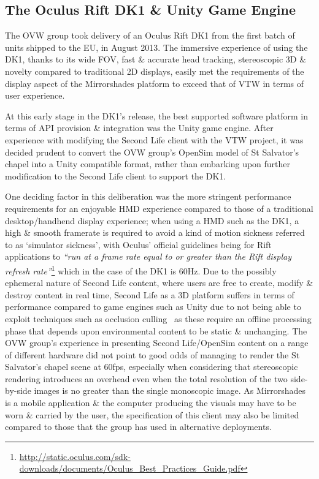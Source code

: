 

\subsection{The Oculus Rift DK1 \& Unity Game Engine}

The OVW group took delivery of an Oculus Rift DK1 from the first batch of units shipped to the EU, in August 2013. The immersive experience of using the DK1, thanks to its wide FOV, fast \& accurate head tracking, stereoscopic 3D \& novelty compared to traditional 2D displays, easily met the requirements of the display aspect of the Mirrorshades platform to exceed that of VTW in terms of user experience.

At this early stage in the DK1's release, the best supported software platform in terms of API provision \& integration was the Unity game engine. After experience with modifying the Second Life client with the VTW project, it was decided prudent to convert the OVW group's OpenSim model of St Salvator's chapel into a Unity compatible format, rather than embarking upon further modification to the Second Life client to support the DK1.

One deciding factor in this deliberation was the more stringent performance requirements for an enjoyable HMD experience compared to those of a traditional desktop/handhend display experience; when using a HMD such as the DK1, a high \& smooth framerate is required to avoid a kind of motion sickness referred to as `simulator sickness', with Oculus' official guidelines being for Rift applications to \textit{``run at a frame rate equal to or greater than the Rift display refresh rate''}\footnote{\url{http://static.oculus.com/sdk-downloads/documents/Oculus_Best_Practices_Guide.pdf}} which in the case of the DK1 is 60Hz. Due to the possibly ephemeral nature of Second Life content, where users are free to create, modify \& destroy content in real time, Second Life as a 3D platform suffers in terms of performance compared to game engines such as Unity due to not being able to exploit techniques such as occlusion culling~\cite{willmott:largecomplex} as these require an offline processing phase that depends upon environmental content to be static \& unchanging. The OVW group's experience in presenting Second Life/OpenSim content on a range of different hardware did not point to good odds of managing to render the St Salvator's chapel scene at 60fps, especially when considering that stereoscopic rendering introduces an overhead even when the total resolution of the two side-by-side images is no greater than the single monoscopic image. As Mirrorshades is a mobile application \& the computer producing the visuals may have to be worn \& carried by the user, the specification of this client may also be limited compared to those that the group has used in alternative deployments.

